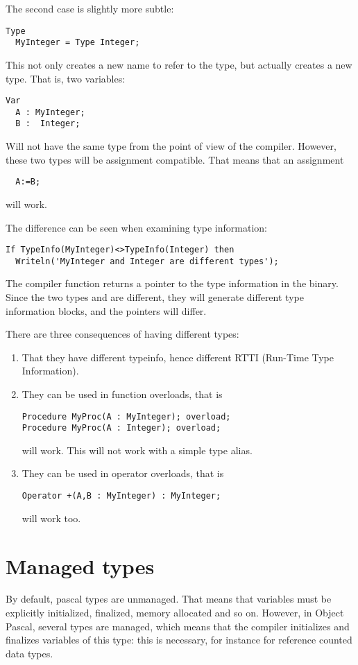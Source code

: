 The second case is slightly more subtle:
\begin{verbatim}
Type
  MyInteger = Type Integer;
\end{verbatim}
This not only creates a new name to refer to the  type, but
actually creates a new type. That is, two variables:
\begin{verbatim}
Var
  A : MyInteger;
  B :  Integer;
\end{verbatim}
Will not have the same type from the point of view of the compiler. However,
these two types will be assignment compatible.
That means that an assignment
\begin{verbatim}
  A:=B;
\end{verbatim}
will work.

The difference can be seen when examining type information:
\begin{verbatim}
If TypeInfo(MyInteger)<>TypeInfo(Integer) then
  Writeln('MyInteger and Integer are different types');
\end{verbatim}
The compiler function  returns a pointer to the type
information in the binary. Since the two types  and
 are different, they will generate different type
information blocks, and the pointers will differ.

There are three consequences of having different types:
\begin{enumerate}
\item That they have different typeinfo, hence different RTTI (Run-Time Type Information).
\item They can be used in function overloads, that is
\begin{verbatim}
Procedure MyProc(A : MyInteger); overload;
Procedure MyProc(A : Integer); overload;
\end{verbatim}
will work. This will not work with a simple type alias.
\item They can be used in operator overloads, that is
\begin{verbatim}
Operator +(A,B : MyInteger) : MyInteger;
\end{verbatim}
will work too.
\end{enumerate}

\section{Managed types}
\label{se:managedtypes}
By default, pascal types are unmanaged. That means that variables must be
explicitly initialized, finalized, memory allocated and so on.
However, in Object Pascal, several types are managed, which means that the
compiler initializes and finalizes variables of this type: this is necessary,
for instance for reference counted data types.

